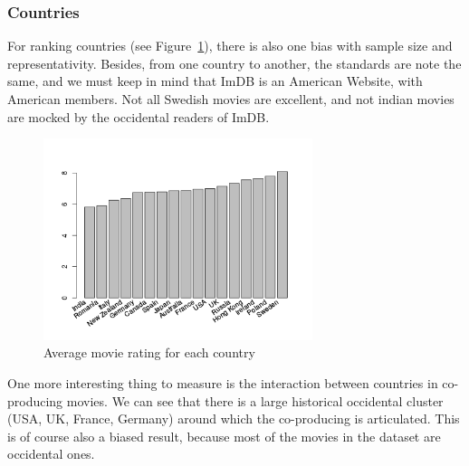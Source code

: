 \newpage
\subsubsection{Countries}
\label{subs:Countries}

For ranking countries (see Figure~\ref{fig:rateByCountry}), there is also one bias with sample size and representativity.
Besides, from one country to another, the standards are note the same, and we must keep in mind that ImDB is an American Website, with American members.
Not all Swedish movies are excellent, and not indian movies are mocked by the occidental readers of ImDB.

\begin{figure}[!h]
\begin{center}
\includegraphics[width=0.70\textwidth]{../src/pre-processing/stats/results/rateByCountry.png}
\end{center}
\caption{Average movie rating for each country}
\label{fig:rateByCountry}
\end{figure}

One more interesting thing to measure is the interaction between countries in co-producing movies.
We can see that there is a large historical occidental cluster (USA, UK, France, Germany) around which the co-producing is articulated.
This is of course also a biased result, because most of the movies in the dataset are occidental ones.


